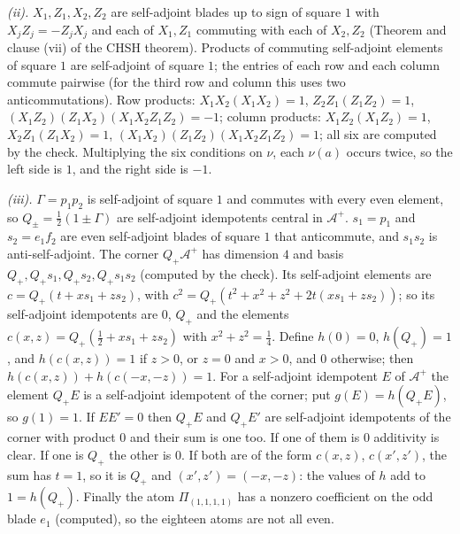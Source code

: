 \emph{(ii).} $X_{1}, Z_{1}, X_{2}, Z_{2}$ are self-adjoint blades up to sign of square $1$ with $X_{j}Z_{j} = -Z_{j}X_{j}$ and each of $X_{1}, Z_{1}$ commuting with each of $X_{2}, Z_{2}$ (Theorem  and clause (vii) of the CHSH theorem). Products of commuting self-adjoint elements of square $1$ are self-adjoint of square $1$; the entries of each row and each column commute pairwise (for the third row and column this uses two anticommutations). Row products: $X_{1}X_{2}(X_{1}X_{2}) = 1$, $Z_{2}Z_{1}(Z_{1}Z_{2}) = 1$, $(X_{1}Z_{2})(Z_{1}X_{2})(X_{1}X_{2}Z_{1}Z_{2}) = -1$; column products: $X_{1}Z_{2}(X_{1}Z_{2}) = 1$, $X_{2}Z_{1}(Z_{1}X_{2}) = 1$, $(X_{1}X_{2})(Z_{1}Z_{2})(X_{1}X_{2}Z_{1}Z_{2}) = 1$; all six are computed by the check. Multiplying the six conditions on $\nu$, each $\nu(a)$ occurs twice, so the left side is $1$, and the right side is $-1$.

\emph{(iii).} $\Gamma = p_{1}p_{2}$ is self-adjoint of square $1$ and commutes with every even element, so $Q_{\pm} = \tfrac12(1 \pm \Gamma)$ are self-adjoint idempotents central in $\mathcal{A}^{+}$. $s_{1} = p_{1}$ and $s_{2} = e_{1}f_{2}$ are even self-adjoint blades of square $1$ that anticommute, and $s_{1}s_{2}$ is anti-self-adjoint. The corner $Q_{+}\mathcal{A}^{+}$ has dimension $4$ and basis $Q_{+}, Q_{+}s_{1}, Q_{+}s_{2}, Q_{+}s_{1}s_{2}$ (computed by the check). Its self-adjoint elements are $c = Q_{+}(t + xs_{1} + zs_{2})$, with $c^{2} = Q_{+}(t^{2} + x^{2} + z^{2} + 2t(xs_{1} + zs_{2}))$; so its self-adjoint idempotents are $0$, $Q_{+}$ and the elements $c(x, z) = Q_{+}(\tfrac12 + xs_{1} + zs_{2})$ with $x^{2} + z^{2} = \tfrac14$. Define $h(0) = 0$, $h(Q_{+}) = 1$, and $h(c(x, z)) = 1$ if $z > 0$, or $z = 0$ and $x > 0$, and $0$ otherwise; then $h(c(x, z)) + h(c(-x, -z)) = 1$. For a self-adjoint idempotent $E$ of $\mathcal{A}^{+}$ the element $Q_{+}E$ is a self-adjoint idempotent of the corner; put $g(E) = h(Q_{+}E)$, so $g(1) = 1$. If $EE' = 0$ then $Q_{+}E$ and $Q_{+}E'$ are self-adjoint idempotents of the corner with product $0$ and their sum is one too. If one of them is $0$ additivity is clear. If one is $Q_{+}$ the other is $0$. If both are of the form $c(x, z)$, $c(x', z')$, the sum has $t = 1$, so it is $Q_{+}$ and $(x', z') = (-x, -z)$: the values of $h$ add to $1 = h(Q_{+})$. Finally the atom $\Pi_{(1,1,1,1)}$ has a nonzero coefficient on the odd blade $e_{1}$ (computed), so the eighteen atoms are not all even.
